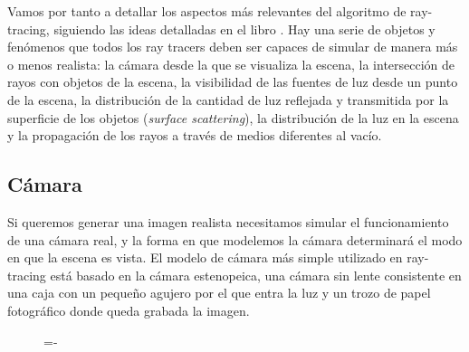 Vamos por tanto a detallar los aspectos más relevantes del algoritmo de ray-tracing, siguiendo las ideas detalladas en el libro \cite{Pharr2016}. Hay una serie de objetos y fenómenos que todos los ray tracers deben ser capaces de simular de manera más o menos realista: la cámara desde la que se visualiza la escena, la intersección de rayos con objetos de la escena, la visibilidad de las fuentes de luz desde un punto de la escena, la distribución de la cantidad de luz reflejada y transmitida por la superficie de los objetos (\emph{surface scattering}), la distribución de la luz en la escena y la propagación de los rayos a través de medios diferentes al vacío.
\subsection{Cámara}

Si queremos generar una imagen realista necesitamos simular el funcionamiento de una cámara real, y la forma en que modelemos la cámara determinará el modo en que la escena es vista. El modelo de cámara más simple utilizado en ray-tracing está basado en la cámara estenopeica, una cámara sin lente consistente en una caja con un pequeño agujero por el que entra la luz y un trozo de papel fotográfico donde queda grabada la imagen.

\begin{figure}[h]
  \lineskip=-\fboxrule
\end{figure}

